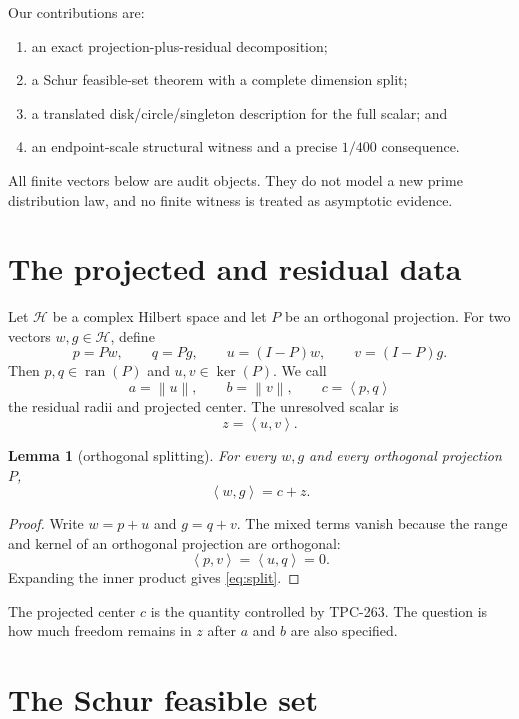 \documentclass[11pt]{article}
\newtheorem{lemma}{Lemma}
\theoremstyle{definition}
\newcommand{\HH}{\mathcal H}
\newcommand{\ip}[2]{\left\langle #1,#2\right\rangle}
\newcommand{\norm}[1]{\left\lVert #1\right\rVert}
\begin{document}
Our contributions are:
\begin{enumerate}
 \item an exact projection-plus-residual decomposition;
 \item a Schur feasible-set theorem with a complete dimension split;
 \item a translated disk/circle/singleton description for the full scalar; and
 \item an endpoint-scale structural witness and a precise $1/400$ consequence.
\end{enumerate}

All finite vectors below are audit objects.  They do not model a new prime
distribution law, and no finite witness is treated as asymptotic evidence.

\section{The projected and residual data}

Let $\HH$ be a complex Hilbert space and let $P$ be an orthogonal projection.
For two vectors $w,g\in\HH$, define
\[
 p=Pw,\qquad q=Pg,\qquad u=(I-P)w,\qquad v=(I-P)g.
\]
Then $p,q\in\operatorname{ran}(P)$ and $u,v\in\ker(P)$.  We call
\[
 a=\norm{u},\qquad b=\norm{v},\qquad c=\ip{p}{q}
\]
the residual radii and projected center.  The unresolved scalar is
\[
 z=\ip{u}{v}.
\]

\begin{lemma}[orthogonal splitting]
For every $w,g$ and every orthogonal projection $P$,
\begin{equation}
 \ip{w}{g}=c+z.
 \label{eq:split}
\end{equation}
\end{lemma}

\begin{proof}
Write $w=p+u$ and $g=q+v$.  The mixed terms vanish because the range and
kernel of an orthogonal projection are orthogonal:
\[
 \ip{p}{v}=\ip{u}{q}=0.
\]
Expanding the inner product gives \eqref{eq:split}.
\end{proof}

The projected center $c$ is the quantity controlled by TPC-263.  The question
is how much freedom remains in $z$ after $a$ and $b$ are also specified.

\section{The Schur feasible set}
\end{document}
